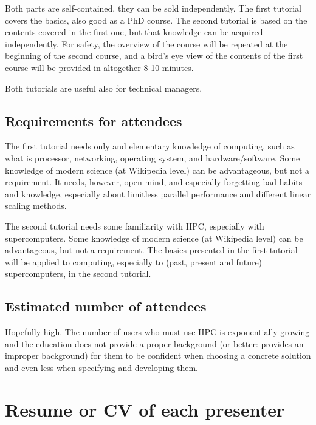 \documentclass[preprint,12pt,authoryear]{article}
\begin{document}
	Both parts are self-contained, they can be sold independently.
	The first tutorial covers the basics, also good as a PhD course.
	The second tutorial is based on the contents covered in the first one,
	but that knowledge can be acquired independently. 
	For safety, the overview of the course will be repeated at the beginning
	of the second course, and a bird's eye view of the contents of the first course will be provided 
	in altogether 8-10 minutes.
	
	
	 Both tutorials are useful also for technical managers.
	
	\subsection{Requirements for attendees}
	The first tutorial needs only and elementary knowledge of computing, such as what is processor, networking, operating system, 
	and hardware/software. Some knowledge of modern science (at Wikipedia level)
	can be advantageous, but not a requirement.
	It needs, however,  open mind, and especially 
	forgetting bad habits and knowledge, especially about limitless 
	parallel performance and different linear scaling methods.
	
	The second tutorial needs some familiarity with HPC, especially with
	supercomputers. Some knowledge of modern science (at Wikipedia level)
	can be advantageous, but not a requirement.
	The basics presented in the first tutorial
	will be applied to computing, especially to (past, present and future)
	supercomputers, in the second tutorial.
	
	\subsection{Estimated number of attendees}
	Hopefully high. The number of users who must use HPC is exponentially
	growing and the education does not provide a proper background (or better: provides an improper background) for them
	to be confident when choosing a concrete solution and even less when
	specifying and developing them.
	
\section{Resume or CV of each presenter}
\end{document}
